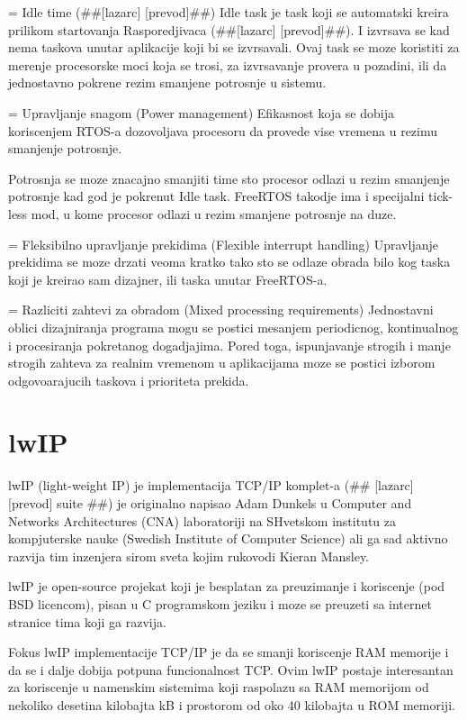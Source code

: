 \documentclass[a4paper,12pt, master]{etf}
\begin{document}
	= Idle time (\#\#[lazarc] [prevod]\#\#)
		Idle task je task koji se automatski kreira prilikom startovanja Rasporedjivaca (\#\#[lazarc]
		[prevod]\#\#). I izvrsava se kad nema taskova unutar aplikacije koji bi se izvrsavali. Ovaj
		task se moze koristiti za merenje procesorske moci koja se trosi, za izvrsavanje provera u
		pozadini, ili da jednostavno pokrene rezim smanjene potrosnje u sistemu.

	= Upravljanje snagom (Power management)
		Efikasnost koja se dobija koriscenjem RTOS-a dozovoljava procesoru da provede vise vremena
		u rezimu smanjenje potrosnje.

		Potrosnja se moze znacajno smanjiti time sto procesor odlazi u rezim smanjenje potrosnje
		kad god je pokrenut Idle task. FreeRTOS takodje ima i specijalni tick-less mod, u kome
		procesor odlazi u rezim smanjene potrosnje na duze.

	= Fleksibilno upravljanje prekidima (Flexible interrupt handling)
		Upravljanje prekidima se moze drzati veoma kratko tako sto se odlaze obrada bilo kog taska
		koji je kreirao sam dizajner, ili taska unutar FreeRTOS-a.

	= Razliciti zahtevi za obradom (Mixed processing requirements)
		Jednostavni oblici dizajniranja programa mogu se postici mesanjem periodicnog, kontinualnog
		i procesiranja pokretanog dogadjajima. Pored toga, ispunjavanje strogih i manje strogih
		zahteva za realnim vremenom u aplikacijama moze se postici izborom odgovoarajucih taskova i
		prioriteta prekida.

	\section{lwIP}

	lwIP (light-weight IP) je implementacija TCP/IP komplet-a (\#\# [lazarc] [prevod] suite \#\#) je
	originalno napisao Adam Dunkels u Computer and Networks Architectures (CNA) laboratoriji na
	SHvetskom institutu za kompjuterske nauke (Swedish Institute of Computer Science) ali ga sad
	aktivno razvija tim inzenjera sirom sveta kojim rukovodi Kieran Mansley.

	lwIP je open-source projekat koji je besplatan za preuzimanje i koriscenje (pod BSD licencom),
	pisan u C programskom jeziku i moze se preuzeti sa internet stranice tima koji ga razvija.

	Fokus lwIP implementacije TCP/IP je da se smanji koriscenje RAM memorije i da se i dalje dobija
	potpuna funcionalnost TCP. Ovim lwIP postaje interesantan za koriscenje u namenskim sistemima
	koji raspolazu sa RAM memorijom od nekoliko desetina kilobajta kB i prostorom od oko 40
	kilobajta u ROM memoriji.
\end{document}
